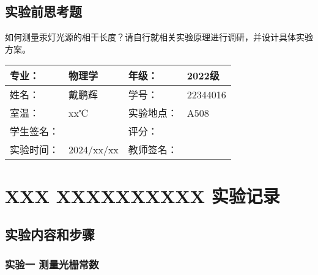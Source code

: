\documentclass[dvipsnames, svgnames,a4paper,11pt]{article}
\begin{document}

	




\subsection{实验前思考题}
	\begin{question}
		如何测量汞灯光源的相干长度？请自行就相关实验原理进行调研，并设计具体实验方案。
	\end{question}
	
	

\clearpage
\begin{table}
	\renewcommand\arraystretch{1.7}
	\centering
	\begin{tabularx}{\textwidth}{|X|X|X|X|}
	\hline
	专业：& 物理学 &年级：& 2022级 \\
	\hline
	姓名：& 戴鹏辉 & 学号：& 22344016 \\
	\hline
	室温：& xx℃ & 实验地点： & A508 \\
	\hline
	学生签名：& & 评分： &\\
	\hline
	实验时间：& 2024/xx/xx & 教师签名：&\\
	\hline
	\end{tabularx}
\end{table}

\section{XXX \quad XXXXXXXXXX \quad\heiti 实验记录}
\subsection{实验内容和步骤}

	\subsubsection{实验一 测量光栅常数}
	
\end{document}
